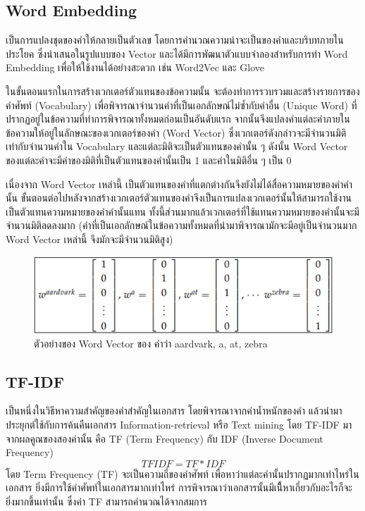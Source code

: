 \documentclass[12pt,oneside,openright,a4paper]{cpe-thai-project}
\begin{document}
  \subsection{Word Embedding}
    \hspace{1cm}เป็นการแปลงชุดของคำให้กลายเป็นตัวเลข โดยการคำนวณความน่าจะเป็นของคำและบริบทภายในประโยค 
    ซึ่งนำเสนอในรูปแบบของ Vector และได้มีการพัฒนาตัวแบบจำลองสำหรับการทำ Word Embedding 
    เพื่อให้ใช้งานได้อย่างสะดวก เช่น Word2Vec และ Glove 

    \hspace{1cm}ในขั้นตอนแรกในการสร้างเวกเตอร์ตัวแทนของข้อความนั้น จะต้องทำการรวบรวมและสร้างรายการของคำศัพท์ (Vocabulary)  
    เพื่อพิจารณาจำนวนคำที่เป็นเอกลักษณ์ไม่ซ้ำกับคำอื่น (Unique Word) ที่ปรากฏอยู่ในข้อความที่ทำการพิจารณาทั้งหมดก่อนเป็นอันดับแรก 
    จากนั้นจึงแปลงคำแต่ละคำภายในข้อความให้อยู่ในลักษณะของเวกเตอร์ของคำ (Word Vector) ซึ่งเวกเตอร์ดังกล่าวจะมีจำนวนมิติเท่ากับจำนวนคำใน Vocabulary 
    และแต่ละมิติจะเป็นตัวแทนของคำนั้น ๆ ดังนั้น Word Vector ของแต่ละคำจะมีค่าของมิติที่เป็นตัวแทนของคำนั้นเป็น 1 และค่าในมิติอื่น ๆ เป็น 0 

    \hspace{1cm}เนื่องจาก Word Vector เหล่านี้ เป็นตัวแทนของคำที่แตกต่างกันจึงยังไม่ได้สื่อความหมายของคำคำนั้น 
    ขั้นตอนต่อไปหลังจากสร้างเวกเตอร์ตัวแทนของคำจึงเป็นการแปลงเวกเตอร์นั้นให้สามารถใช้งานเป็นตัวแทนความหมายของคำคำนั้นแทน 
    ทั้งนี้ส่วนมากแล้วเวกเตอร์ที่ใช้แทนความหมายของคำนั้นจะมีจำนวนมิติลดลงมาก (คำที่เป็นเอกลักษณ์ในข้อความทั้งหมดที่นำมาพิจารณามักจะมีอยู่เป็นจำนวนมาก 
    Word Vector เหล่านี้ จึงมักจะมีจำนวนมิติสูง) \cite{word} 

    \begin{figure}[!ht]\centering
      \includegraphics[width=13cm]{./img/word.png}
      \caption{ตัวอย่างของ Word Vector ของ คำว่า aardvark, a, at, zebra }\label{fig:word}
    \end{figure}
  \subsection{TF-IDF}
    \hspace{1cm} เป็นหนึ่งในวิธีหาความสำคัญของคำสำคัญในเอกสาร โดยพิจารณาจากค่าน้ำหนักของคำ แล้วนำมาประยุกต์ใช้กับการค้นคืนเอกสาร Information-retrieval 
    หรือ Text mining โดย TF-IDF มาจากผลคูณของสองค่านั้น คือ TF (Term Frequency) กับ IDF (Inverse Document Frequency) \cite{tfidf} 
    \[ TFIDF = TF * IDF \] 
    \hspace{1cm}โดย Term Frequency (TF) จะเป็นความถี่ของคำศัพท์ เพื่อหาว่าแต่ละคำนั้นปรากฏมากเท่าไหร่ในเอกสาร ยิ่งมีการใช้คำศัพท์ในเอกสารมากเท่าไหร่
    การพิจารณาว่าเอกสารนั้นมีเนี้ืหาเกี่ยวกับอะไรก็จะยิ่งมากขึ้นเท่านั้น ซึ่งค่า TF สามารถคำนวณได้จากสมการ \cite{tf} 
\end{document}
